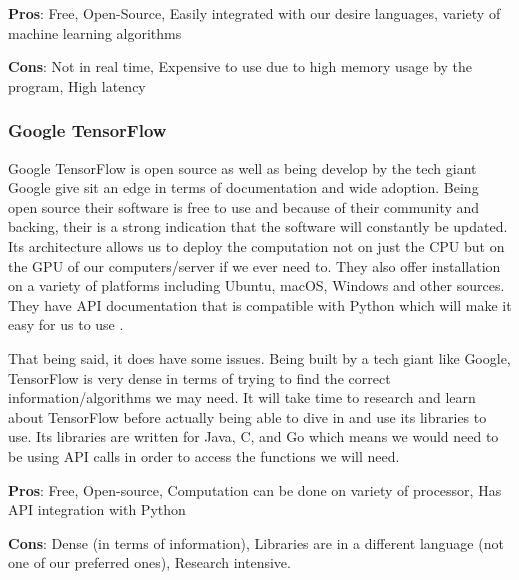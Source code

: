 \documentclass[10pt, onecolumn, draftclsnofoot, letterpaper, compsoc]{IEEEtran}
\begin{document}
    \textbf{Pros}: Free, Open-Source, Easily integrated with our desire languages, variety of machine learning algorithms
    
    \textbf{Cons}: Not in real time, Expensive to use due to high memory usage by the program, High latency
    
    \subsubsection{Google TensorFlow}
    Google TensorFlow is open source as well as being develop by the tech giant Google give sit an edge in terms of documentation and wide adoption.
    Being open source their software is free to use and because of their community and backing, their is a strong indication that the software will constantly be updated.
    Its architecture allows us to deploy the computation not on just the CPU but on the GPU of our computers/server if we ever need to.
    They also offer installation on a variety of platforms including Ubuntu, macOS, Windows and other sources.
    They have API documentation that is compatible with Python which will make it easy for us to use \cite{tensorflow}.\par
    That being said, it does have some issues. 
    Being built by a tech giant like Google, TensorFlow is very dense in terms of trying to find the correct information/algorithms we may need.
    It will take time to research and learn about TensorFlow before actually being able to dive in and use its libraries to use.
    Its libraries are written for Java, C, and Go which means we would need to be using API calls in order to access the functions we will need.
    
    \textbf{Pros}: Free, Open-source, Computation can be done on variety of processor, Has API integration with Python
    
    \textbf{Cons}: Dense (in terms of information), Libraries are in a different language (not one of our preferred ones), Research intensive.
    
\end{document}
